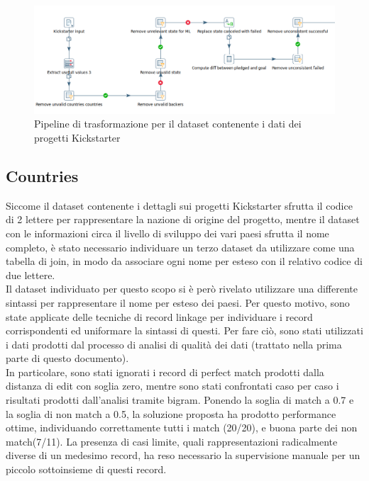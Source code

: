 \begin{figure}
	\hspace*{-1cm}%
	\includegraphics[width=\dimexpr\textwidth+2cm\relax]{images/transformation_kick}%
	\hspace*{-1cm}%
	\caption{Pipeline di trasformazione per il dataset contenente i dati dei progetti Kickstarter}
	\label{fig:transformationkick}
\end{figure}

\subsection{Countries}
Siccome il dataset contenente i dettagli sui progetti Kickstarter sfrutta il codice di 2 lettere per rappresentare la nazione di origine del progetto, mentre il dataset con le informazioni circa il livello di sviluppo dei vari paesi sfrutta il nome completo, è stato necessario individuare un terzo dataset da utilizzare come una tabella di join, in modo da associare ogni nome per esteso con il relativo codice di due lettere.\\
Il dataset individuato per questo scopo si è però rivelato utilizzare una differente sintassi per rappresentare il nome per esteso dei paesi. Per questo motivo, sono state applicate delle tecniche di record linkage per individuare i record corrispondenti ed uniformare la sintassi di questi. Per fare ciò, sono stati utilizzati i dati prodotti dal processo di analisi di qualità dei dati (trattato nella prima parte di questo documento).\\
In particolare, sono stati ignorati i record di perfect match prodotti dalla distanza di edit con soglia zero, mentre sono stati confrontati caso per caso i risultati prodotti dall'analisi tramite bigram. Ponendo la soglia di match a 0.7 e la soglia di non match a 0.5, la soluzione proposta ha prodotto performance ottime, individuando correttamente tutti i match (20/20), e buona parte dei non match(7/11). La presenza di casi limite, quali rappresentazioni radicalmente diverse di un medesimo record, ha reso necessario la supervisione manuale per un piccolo sottoinsieme di questi record.\\

